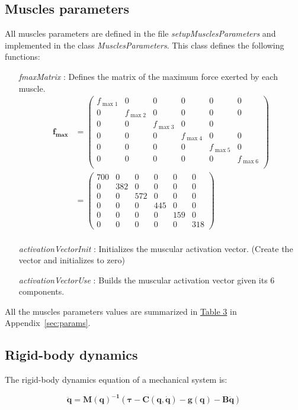 \documentclass[pdftex,a4paper,11pt]{report}
\begin{document}
\subsection{Muscles parameters}
\label{sec:muscle_parameters}
All muscles parameters are defined in the file \textit{setupMusclesParameters} and implemented in the class \textit{MusclesParameters}.
This class defines the following functions:
\begin{itemize}
\item[\textit{fmaxMatrix}]: Defines the matrix of the maximum force exerted by each muscle.
\begin{align*}
\textbf{f}_\textbf{max}   & = \begin{pmatrix}
f_{\max1} &0&0&0&0&0\\
0& f_{\max2}&0&0&0&0\\
0&0& f_{\max3} &0&0\\
0&0&0& f_{\max4} &0&0\\
0&0&0&0& f_{\max5} &0\\
0&0&0&0&0& f_{\max6}\\
\end{pmatrix} \\& = \begin{pmatrix}
700 &0&0&0&0&0\\
 0&382&0&0&0&0\\
0&0 & 572 & 0&0&0\\
0&0&0&445 &0&0\\
0&0&0&0&159 &0\\
0&0&0&0&0&318
\end{pmatrix}\\
\end{align*}
\item[\textit{activationVectorInit}]: Initializes the muscular activation vector. (Create the vector and initializes to zero)
\item[\textit{activationVectorUse}]: Builds the muscular activation vector given its 6 components.
\end{itemize}
All the muscles parameters values are summarized in \hyperref[MuscleParamTable]{Table 3} in Appendix~\ref{sec:params}.

\subsection{Rigid-body dynamics}
\label{sec:arm_dynamics}
The rigid-body dynamics equation of a mechanical system is:

 \begin{equation}
\label{eq:rbd}
    \boldsymbol{\ddot{q} = M(q)^{-1} (\tau - C(q, \dot{q}) - g(q)  - B \dot{q})} 
\end{equation}
\end{document}
